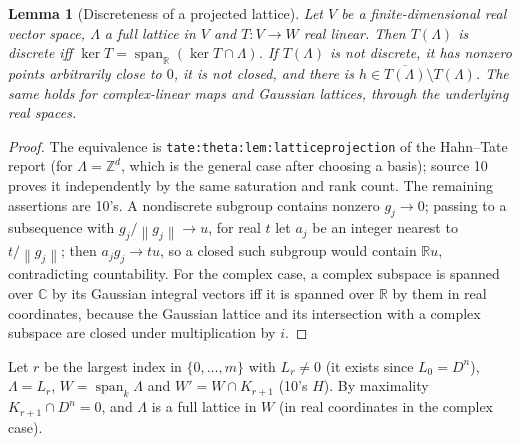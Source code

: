 \documentclass[11pt,oneside]{article}
\numberwithin{equation}{section}
\newtheorem{lemma}[lemma]{Lemma}
\theoremstyle{definition}
\theoremstyle{remark}
\newcommand{\Z}{\mathbb Z}
\newcommand{\R}{\mathbb R}
\newcommand{\C}{\mathbb C}
\newcommand{\Span}{\operatorname{span}}
\newcommand{\norm}[1]{\left\lVert #1\right\rVert}
\newcommand{\replabel}[1]{\nolinkurl{#1}}
\begin{document}
\begin{lemma}[Discreteness of a projected lattice]\label{ogl:lat:lem:projection}
Let $V$ be a finite-dimensional real vector space, $\Lambda$ a full lattice in
$V$ and $T:V\to W$ real linear. Then $T(\Lambda)$ is discrete iff
$\ker T=\Span_\R(\ker T\cap\Lambda)$. If $T(\Lambda)$ is not discrete, it has
nonzero points arbitrarily close to $0$, it is not closed, and there is
$h\in\overline{T(\Lambda)}\setminus T(\Lambda)$. The same holds for
complex-linear maps and Gaussian lattices, through the underlying real spaces.
\end{lemma}
\begin{proof}
The equivalence is \replabel{tate:theta:lem:latticeprojection} of the Hahn--Tate
report (for $\Lambda=\Z^d$, which is the general case after choosing a basis);
source 10 proves it independently by the same saturation and rank count. The
remaining assertions are 10's. A nondiscrete subgroup contains nonzero
$g_j\to0$; passing to a subsequence with $g_j/\norm{g_j}\to u$, for real $t$ let
$a_j$ be an integer nearest to $t/\norm{g_j}$; then $a_jg_j\to tu$, so a closed
such subgroup would contain $\R u$, contradicting countability. For the complex
case, a complex subspace is spanned over $\C$ by its Gaussian integral vectors
iff it is spanned over $\R$ by them in real coordinates, because the Gaussian
lattice and its intersection with a complex subspace are closed under
multiplication by $i$.
\end{proof}

Let $r$ be the largest index in $\{0,\dots,m\}$ with $L_r\ne0$ (it exists since
$L_0=D^n$), $\Lambda=L_r$, $W=\Span_k\Lambda$ and $W'=W\cap K_{r+1}$ (10's $H$).
By maximality $K_{r+1}\cap D^n=0$, and $\Lambda$ is a full lattice in $W$ (in real
coordinates in the complex case).
\end{document}
